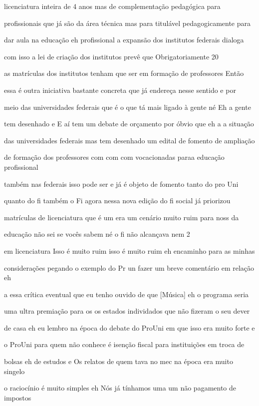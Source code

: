 \documentclass[a4paper,12pt]{article}
\begin{document}
licenciatura inteira de 4 anos mas de complementação pedagógica para

profissionais que já são da área técnica mas para titulável pedagogicamente para

dar aula na educação eh profissional a expansão dos institutos federais dialoga

com isso a lei de criação dos institutos prevê que Obrigatoriamente 20%

as matrículas dos institutos tenham que ser em formação de professores Então

essa é outra iniciativa bastante concreta que já endereça nesse sentido e por

meio das universidades federais que é o que tá mais ligado à gente né Eh a gente

tem desenhado e E aí tem um debate de orçamento por óbvio que eh a a situação

das universidades federais mas tem desenhado um edital de fomento de ampliação

de formação dos professores com com com vocacionadas paraa educação profissional

também nas federais isso pode ser e já é objeto de fomento tanto do pro Uni

quanto do fi também o Fi agora nessa nova edição do fi social já priorizou

matrículas de licenciatura que é um era um cenário muito ruim para noss da

educação não sei se vocês sabem né o fi não alcançava nem 2%

em licenciatura Isso é muito ruim isso é muito ruim eh encaminho para as minhas

considerações pegando o exemplo do Pr un fazer um breve comentário em relação eh

a essa crítica eventual que eu tenho ouvido de que [Música] eh o programa seria

uma ultra premiação para os os estados individados que não fizeram o seu dever

de casa eh eu lembro na época do debate do ProUni em que isso era muito forte e

o ProUni para quem não conhece é isenção fiscal para instituições em troca de

bolsas eh de estudos e Os relatos de quem tava no mec na época era muito singelo

o raciocínio é muito simples eh Nós já tínhamos uma um não pagamento de impostos
\end{document}
